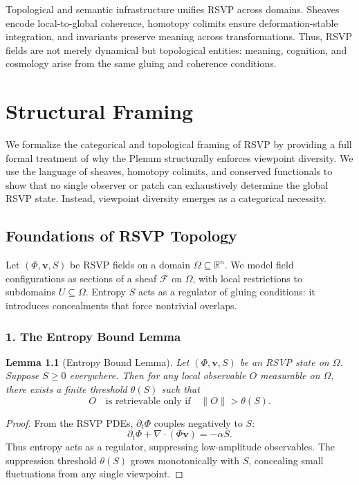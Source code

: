 \documentclass[a4paper,11pt,openany]{book}
\newtheorem{lemma}[theorem]{Lemma}
\begin{document}
Topological and semantic infrastructure unifies RSVP across domains. Sheaves encode 
local-to-global coherence, homotopy colimits ensure deformation-stable integration, 
and invariants preserve meaning across transformations. Thus, RSVP fields are not 
merely dynamical but topological entities: meaning, cognition, and cosmology arise 
from the same gluing and coherence conditions.  

\chapter{Structural Framing}

We formalize the categorical and topological framing of RSVP by providing a full 
formal treatment of why the Plenum structurally enforces viewpoint diversity. 
We use the language of sheaves, homotopy colimits, and conserved functionals to show that 
no single observer or patch can exhaustively determine the global RSVP state. 
Instead, viewpoint diversity emerges as a categorical necessity.

\section{Foundations of RSVP Topology}

Let $(\Phi, \mathbf{v}, S)$ be RSVP fields on a domain $\Omega \subseteq \mathbb{R}^n$. 
We model field configurations as sections of a sheaf $\mathcal{F}$ on $\Omega$, with local restrictions 
to subdomains $U \subseteq \Omega$.  
Entropy $S$ acts as a regulator of gluing conditions: it introduces concealments that force 
nontrivial overlaps.  

\subsection*{1. The Entropy Bound Lemma}

\begin{lemma}[Entropy Bound Lemma]
Let $(\Phi,\mathbf{v},S)$ be an RSVP state on $\Omega$. Suppose $S \geq 0$ everywhere. Then for any local observable $O$ measurable on $\Omega$, there exists a finite threshold $\theta(S)$ such that
\[
O \quad \text{is retrievable only if} \quad \|O\| > \theta(S).
\]
\end{lemma}

\begin{proof}
From the RSVP PDEs, $\partial_t \Phi$ couples negatively to $S$:
\[
\partial_t \Phi + \nabla \cdot (\Phi \mathbf{v}) = -\alpha S.
\]
Thus entropy acts as a regulator, suppressing low-amplitude observables. 
The suppression threshold $\theta(S)$ grows monotonically with $S$, concealing 
small fluctuations from any single viewpoint.  
\end{proof}
\end{document}

